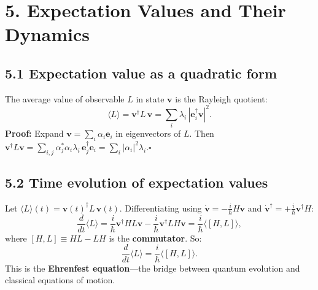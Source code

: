 \documentclass[12pt,a4paper]{article}
\begin{document}
\section{5. Expectation Values and Their Dynamics}

\subsection{5.1 Expectation value as a quadratic form}
The average value of observable $L$ in state $\mathbf{v}$ is the Rayleigh quotient:
\[
    \boxed{\langle L \rangle = \mathbf{v}^\dagger L\,\mathbf{v} = \sum_i \lambda_i\,|\mathbf{e}_i^\dagger\mathbf{v}|^2.}
\]
\textbf{Proof:} Expand $\mathbf{v}=\sum_i \alpha_i\mathbf{e}_i$ in eigenvectors of $L$.  Then $\mathbf{v}^\dagger L\mathbf{v} = \sum_{i,j}\alpha_j^*\alpha_i\lambda_i\,\mathbf{e}_j^\dagger\mathbf{e}_i = \sum_i |\alpha_i|^2\lambda_i$.\;$\square$

\subsection{5.2 Time evolution of expectation values}
Let $\langle L \rangle(t) = \mathbf{v}(t)^\dagger L\,\mathbf{v}(t)$.  Differentiating using $\dot{\mathbf{v}}=-\frac{i}{\hbar}H\mathbf{v}$ and $\dot{\mathbf{v}}^\dagger=+\frac{i}{\hbar}\mathbf{v}^\dagger H$:
\[
    \frac{d}{dt}\langle L \rangle = \frac{i}{\hbar}\mathbf{v}^\dagger HL\mathbf{v} - \frac{i}{\hbar}\mathbf{v}^\dagger LH\mathbf{v} = \frac{i}{\hbar}\langle [H,L] \rangle,
\]
where $[H,L]\equiv HL - LH$ is the \textbf{commutator}.  So:
\[
    \boxed{\frac{d}{dt}\langle L \rangle = \frac{i}{\hbar}\langle [H,L] \rangle.}
\]
This is the \textbf{Ehrenfest equation}---the bridge between quantum evolution and classical equations of motion.
\end{document}

